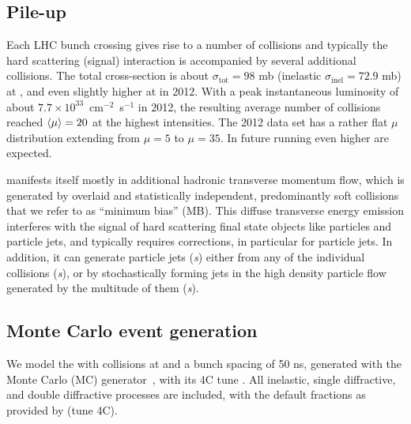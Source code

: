 \subsection{Pile-up}
Each LHC bunch crossing gives rise to a number of \pp{} collisions and typically the hard scattering (signal) interaction is accompanied by several additional \pu{} \pp{} collisions. The total \pp{} cross-section is about $\sigma_{\mathrm{tot}} = 98$ mb (inelastic $\sigma_{\mathrm{inel}} = 72.9$ mb) at  \cite{Antchev:2013iaa}, and even slightly higher at  in 2012. With a peak instantaneous luminosity of about $7.7 \times 10^{33}$~cm$^{-2}$~s$^{-1}$ in 2012, the resulting average number of \pu{} collisions reached $\langle\mu\rangle = 20$ at the highest intensities. The 2012 data set has a rather flat $\mu$ distribution extending from $\mu = 5$ to $\mu = 35$. In future \LHC{} running even higher \axing{} are expected. 

\PU{} manifests itself mostly in additional hadronic transverse momentum 
flow, which is generated by overlaid and statistically independent, 
predominantly soft \pp{} collisions that we refer to as 
``minimum bias'' (MB). This diffuse 
transverse energy emission interferes with the signal of hard scattering 
final state objects like particles and particle jets, and typically 
requires corrections, in particular for particle jets.  In addition,
 it can generate particle jets (\emph{\pujet s}) either from any of 
the individual \MB{} collisions (\emph{\qcdjet s}), or by stochastically 
forming jets in the high density particle flow generated by the 
multitude of them (\emph{\stojet s}).  


\subsection{Monte Carlo event generation} \label{subsec:mc} 

We model the \pu{} with \MB{} collisions at  and
a bunch spacing of 50 ns, generated with the \pythia{} Monte Carlo
(MC) generator~\cite{pythia,pythia8}, with its 
{\sc 4C} tune  \cite{Corke:2010yf}. 
All inelastic, single diffractive, and double diffractive processes are 
included, with the default fractions as provided by \pythia (tune 4C). 

